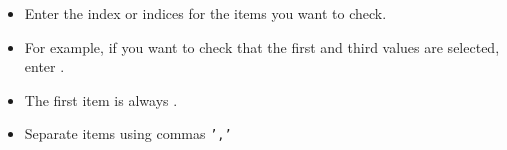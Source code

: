 \begin{itemize}
\item Enter the index or indices for the items you want to check.
\item For example, if you want to check that the first and third values are selected, enter .
\item The first item is always . 
\item Separate items using commas {\tt ','}
\end{itemize}

    